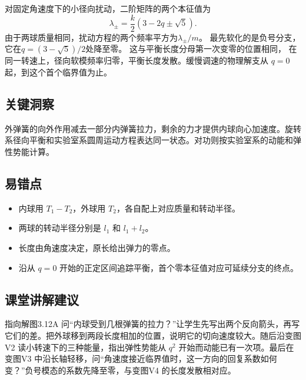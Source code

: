 \documentclass[UTF8,fontset=fandol,a4paper,11pt]{ctexart}
\begin{document}
对固定角速度下的小径向扰动，二阶矩阵的两个本征值为
\[
\lambda_\pm=\frac k2(3-2q\pm\sqrt5).
\]
由于两球质量相同，扰动方程的两个频率平方为$\lambda_\pm/m$。
最先软化的是负号分支，它在$q=(3-\sqrt5)/2$处降至零。
这与平衡长度分母第一次变零的位置相同，
在同一转速上，径向软模频率归零，平衡长度发散。缓慢调速的物理解支从 $q=0$ 起，到这个首个临界值为止。




\subsection*{关键洞察}

外弹簧的向外作用减去一部分内弹簧拉力，剩余的力才提供内球向心加速度。旋转系径向平衡和实验室系圆周运动方程表达同一状态。对功则按实验室系的动能和弹性势能计算。



\subsection*{易错点}

\begin{itemize}
\item 内球用 $T_1-T_2$，外球用 $T_2$，各自配上对应质量和转动半径。
\item 两球的转动半径分别是 $l_1$ 和 $l_1+l_2$。
\item 长度由角速度决定，原长给出弹力的零点。
\item 沿从 $q=0$ 开始的正定区间追踪平衡，首个零本征值对应可延续分支的终点。
\end{itemize}



\subsection*{课堂讲解建议}

指向解图3.12A 问“内球受到几根弹簧的拉力？”让学生先写出两个反向箭头，再写它们的差。把外球移到两段长度相加的位置，说明它的切向速度较大。随后沿变图V2 读小转速下的三种能量，指出弹性势能从 $q^2$ 开始而动能已有一次项。最后在变图V3 中沿长轴轻移，问“角速度接近临界值时，这一方向的回复系数如何变？”负号模态的系数先降至零，与变图V4 的长度发散相对应。
\end{document}
